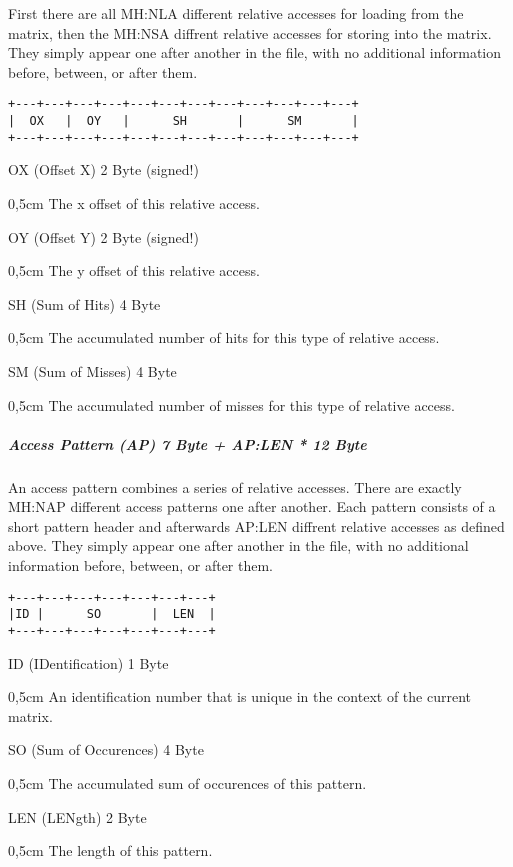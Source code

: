 First there are all MH:NLA different relative accesses for loading from the matrix, then the MH:NSA diffrent 
relative accesses for storing into the matrix. They simply appear one after another in the file, with no 
additional information before, between, or after them.
\begin{verbatim}
+---+---+---+---+---+---+---+---+---+---+---+---+
|  OX   |  OY   |      SH       |      SM       |
+---+---+---+---+---+---+---+---+---+---+---+---+
\end{verbatim}
OX (Offset X) 2 Byte (signed!)
\begin{addmargin}[0,5cm]{0,5cm} 
	The x offset of this relative access.
\end{addmargin}
OY (Offset Y) 2 Byte (signed!)
\begin{addmargin}[0,5cm]{0,5cm} 
	The y offset of this relative access.
\end{addmargin}
SH (Sum of Hits) 4 Byte
\begin{addmargin}[0,5cm]{0,5cm} 
	The accumulated number of hits for this type of relative access.
\end{addmargin}
SM (Sum of Misses) 4 Byte
\begin{addmargin}[0,5cm]{0,5cm} 
	The accumulated number of misses for this type of relative access.
\end{addmargin}
\newpage
\subparagraph{Access Pattern (AP) 7 Byte + AP:LEN * 12 Byte}$\;$ \\

An access pattern combines a series of relative accesses. There are exactly MH:NAP different access patterns
 one after another. Each pattern consists of a short pattern header and afterwards AP:LEN diffrent relative 
accesses as defined above. They simply appear one after another in the file, with no additional information 
before, between, or after them.
\begin{verbatim}
+---+---+---+---+---+---+---+
|ID |      SO       |  LEN  |
+---+---+---+---+---+---+---+
\end{verbatim}
ID (IDentification) 1 Byte
\begin{addmargin}[0,5cm]{0,5cm} 
	An identification number that is unique in the context of the current matrix.
\end{addmargin}
SO (Sum of Occurences) 4 Byte
\begin{addmargin}[0,5cm]{0,5cm} 
	The accumulated sum of occurences of this pattern.
\end{addmargin}
LEN (LENgth) 2 Byte
\begin{addmargin}[0,5cm]{0,5cm} 
	The length of this pattern.
\end{addmargin}
	
